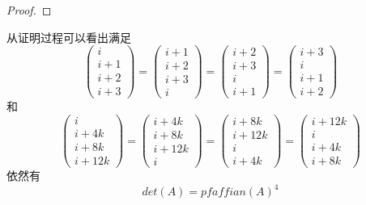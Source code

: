 \documentclass[twoside,a4paper,CCT]{cctart}   %
\begin{document}
\begin{proof}
\end{proof}
从证明过程可以看出满足$$\begin{pmatrix}i\\i+1\\i+2\\i+3 \end{pmatrix}=\begin{pmatrix}i+1\\i+2\\i+3\\i \end{pmatrix}=\begin{pmatrix}i+2\\i+3\\i\\i+1 \end{pmatrix}=\begin{pmatrix}i+3\\i\\i+1\\i+2 \end{pmatrix}$$和$$\begin{pmatrix}i\\i+4k\\i+8k\\i+12k \end{pmatrix}=\begin{pmatrix}i+4k\\i+8k\\i+12k\\i \end{pmatrix}=\begin{pmatrix}i+8k\\i+12k\\i\\i+4k \end{pmatrix}=\begin{pmatrix}i+12k\\i\\i+4k\\i+8k \end{pmatrix}$$
依然有$$det(A)=pfaffian(A)^{4}$$
\end{document}

